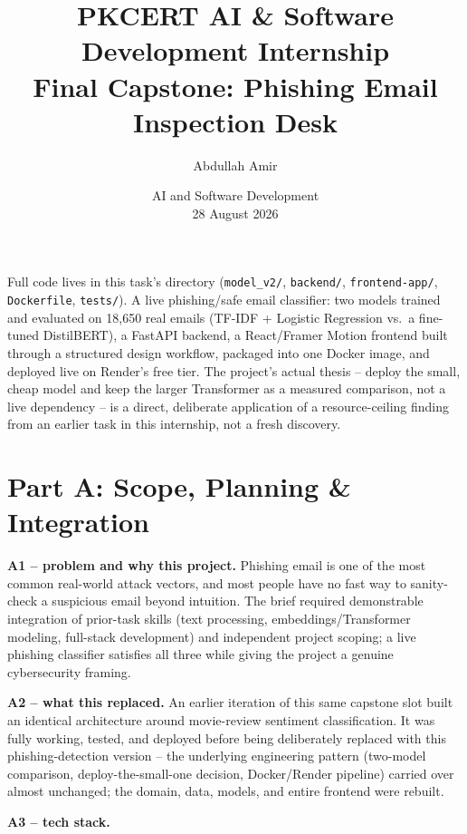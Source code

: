 \documentclass[11pt,a4paper]{article}
\title{\vspace{-1.5cm}\textbf{PKCERT AI \& Software Development Internship \\ Final Capstone: Phishing Email Inspection Desk}}
\author{Abdullah Amir}
\date{AI and Software Development \\ 28 August 2026}
\begin{document}
\maketitle
\vspace{-0.8cm}

Full code lives in this task's directory (\texttt{model\_v2/}, \texttt{backend/},
\texttt{frontend-app/}, \texttt{Dockerfile}, \texttt{tests/}). A live phishing/safe email
classifier: two models trained and evaluated on 18{,}650 real emails (TF-IDF + Logistic
Regression vs.\ a fine-tuned DistilBERT), a FastAPI backend, a React/Framer Motion frontend
built through a structured design workflow, packaged into one Docker image, and deployed live
on Render's free tier. The project's actual thesis -- deploy the small, cheap model and keep
the larger Transformer as a measured comparison, not a live dependency -- is a direct,
deliberate application of a resource-ceiling finding from an earlier task in this internship,
not a fresh discovery.

\section*{Part A: Scope, Planning \& Integration}

\textbf{A1 -- problem and why this project.} Phishing email is one of the most common
real-world attack vectors, and most people have no fast way to sanity-check a suspicious
email beyond intuition. The brief required demonstrable integration of prior-task skills
(text processing, embeddings/Transformer modeling, full-stack development) and independent
project scoping; a live phishing classifier satisfies all three while giving the project a
genuine cybersecurity framing.

\textbf{A2 -- what this replaced.} An earlier iteration of this same capstone slot built an
identical architecture around movie-review sentiment classification. It was fully working,
tested, and deployed before being deliberately replaced with this phishing-detection version
-- the underlying engineering pattern (two-model comparison, deploy-the-small-one decision,
Docker/Render pipeline) carried over almost unchanged; the domain, data, models, and entire
frontend were rebuilt.

\textbf{A3 -- tech stack.}
\end{document}
